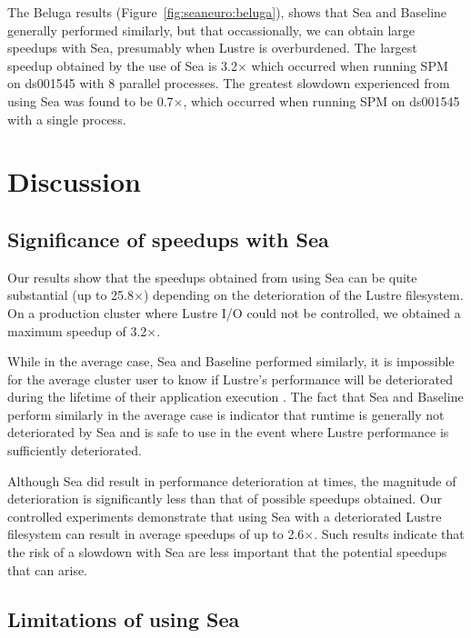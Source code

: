 The Beluga results (Figure~\ref{fig:seaneuro:beluga}), 
shows that Sea and Baseline generally performed 
similarly, but that occassionally, we can obtain large 
speedups with Sea, presumably when Lustre is 
overburdened. The largest speedup obtained by the use of
Sea is 3.2$\times$ which occurred when running SPM on ds001545 with 8 parallel processes. The greatest
slowdown experienced from using Sea was found to be 0.7$\times$, which occurred when running SPM on ds001545 with a single process. 

    
    
    \section{Discussion}
    \subsection{Significance of speedups with Sea}

    Our results show that the speedups obtained from
    using Sea can be quite substantial (up to 25.8$\times$)
    depending on the deterioration of the Lustre
    filesystem. On a production cluster where Lustre I/O could not be controlled, we obtained a maximum speedup of 3.2$\times$.

    While in the average case, Sea and Baseline performed similarly, it is impossible for the
    average cluster user to know if Lustre's performance
    will be deteriorated during the lifetime of their
    application execution . The fact that Sea and Baseline perform similarly in the average case is indicator that runtime is generally not
    deteriorated by Sea and is safe to use in the event where Lustre performance is sufficiently deteriorated.

    Although Sea did result in performance deterioration at times, the
    magnitude of deterioration is significantly less than that of possible
    speedups obtained. Our controlled experiments demonstrate that using
    Sea with a deteriorated Lustre filesystem can result in average
    speedups of up to 2.6$\times$. Such results indicate that the risk of a
    slowdown with Sea are less important that the potential speedups that
    can arise.

    \subsection{Limitations of using Sea}
    

